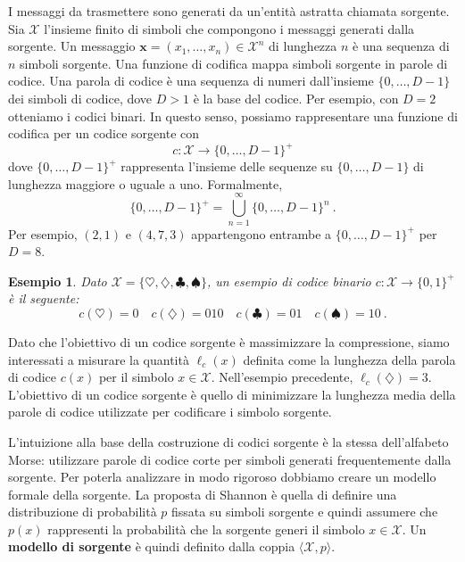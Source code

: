 \documentclass[11pt]{article}
\newtheorem{example}[theorem]{Esempio}
\newcommand{\bx}{ \boldsymbol{x} }
\newcommand{\scX}{\mathcal{X}}
\begin{document}
\begin{center}
\end{center}

\bigskip

I messaggi da trasmettere sono generati da un'entità astratta chiamata sorgente. Sia $\scX$ l'insieme finito di simboli che compongono i messaggi generati dalla sorgente. Un messaggio $\bx = (x_1,\dots,x_n) \in \scX^n$ di lunghezza $n$ è una sequenza di $n$ simboli sorgente. Una funzione di codifica mappa simboli sorgente in parole di codice. Una parola di codice è una sequenza di numeri dall'insieme $\{0,\dots,D-1\}$ dei simboli di codice, dove $D > 1$ è la base del codice. Per esempio, con $D=2$ otteniamo i codici binari. In questo senso, possiamo rappresentare una funzione di codifica per un codice sorgente con
\[
    c : \scX \to \{0,\dots,D-1\}^+
\]
dove $\{0,\dots,D-1\}^+$ rappresenta l'insieme delle sequenze su $\{0,\dots,D-1\}$ di lunghezza maggiore o uguale a uno. Formalmente,
\[
    \{0,\dots,D-1\}^+ = \bigcup_{n=1}^{\infty} \{0,\dots,D-1\}^n~.
\]
Per esempio, $(2,1)$ e $(4,7,3)$ appartengono entrambe a $\{0,\dots,D-1\}^+$ per $D=8$.
%
\begin{example}
\label{ex:1}
Dato $\scX = \{\heartsuit,\diamondsuit,\clubsuit,\spadesuit\}$, un esempio di codice binario $c : \scX\to\{0,1\}^+$ è il seguente:
\[
    c(\heartsuit) = 0 \quad c(\diamondsuit) = 010 \quad c(\clubsuit) = 01 \quad c(\spadesuit) = 10~.
\]
\end{example}
%
Dato che l'obiettivo di un codice sorgente è massimizzare la compressione, siamo interessati a misurare la quantità $\ell_c(x)$ definita come la lunghezza della parola di codice $c(x)$ per il simbolo $x\in\scX$. Nell'esempio precedente, $\ell_c(\diamondsuit) = 3$.
L'obiettivo di un codice sorgente è quello di minimizzare la lunghezza media della parole di codice utilizzate per codificare i simbolo sorgente.

L'intuizione alla base della costruzione di codici sorgente è la stessa dell'alfabeto Morse: utilizzare parole di codice corte per simboli generati frequentemente dalla sorgente. Per poterla analizzare in modo rigoroso dobbiamo creare un modello formale della sorgente. La proposta di Shannon è quella di definire una distribuzione di probabilità $p$ fissata su simboli sorgente e quindi assumere che $p(x)$ rappresenti la probabilità che la sorgente generi il simbolo $x\in\scX$. Un \textbf{modello di sorgente} è quindi definito dalla coppia $\langle\scX,p\rangle$.
\end{document}
